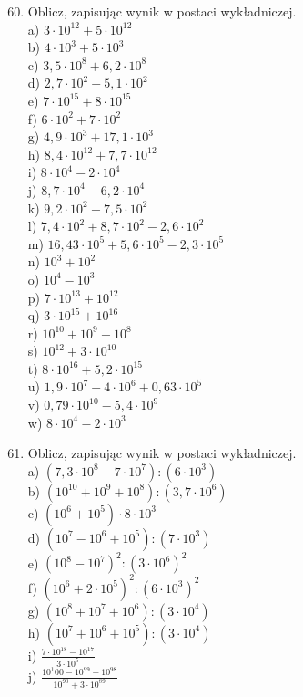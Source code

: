 \documentclass[10pt]{article}
\begin{document}
\begin{enumerate}
  \setcounter{enumi}{59}
  \item Oblicz, zapisując wynik w postaci wykładniczej.\\
a) \(3 \cdot 10^{12}+5 \cdot 10^{12}\)\\
b) \(4 \cdot 10^{3}+5 \cdot 10^{3}\)\\
c) \(3,5 \cdot 10^{8}+6,2 \cdot 10^{8}\)\\
d) \(2,7 \cdot 10^{2}+5,1 \cdot 10^{2}\)\\
e) \(7 \cdot 10^{15}+8 \cdot 10^{15}\)\\
f) \(6 \cdot 10^{2}+7 \cdot 10^{2}\)\\
g) \(4,9 \cdot 10^{3}+17,1 \cdot 10^{3}\)\\
h) \(8,4 \cdot 10^{12}+7,7 \cdot 10^{12}\)\\
i) \(8 \cdot 10^{4}-2 \cdot 10^{4}\)\\
j) \(8,7 \cdot 10^{4}-6,2 \cdot 10^{4}\)\\
k) \(9,2 \cdot 10^{2}-7,5 \cdot 10^{2}\)\\
l) \(7,4 \cdot 10^{2}+8,7 \cdot 10^{2}-2,6 \cdot 10^{2}\)\\
m) \(16,43 \cdot 10^{5}+5,6 \cdot 10^{5}-2,3 \cdot 10^{5}\)\\
n) \(10^{3}+10^{2}\)\\
o) \(10^{4}-10^{3}\)\\
p) \(7 \cdot 10^{13}+10^{12}\)\\
q) \(3 \cdot 10^{15}+10^{16}\)\\
r) \(10^{10}+10^{9}+10^{8}\)\\
s) \(10^{12}+3 \cdot 10^{10}\)\\
t) \(8 \cdot 10^{16}+5,2 \cdot 10^{15}\)\\
u) \(1,9 \cdot 10^{7}+4 \cdot 10^{6}+0,63 \cdot 10^{5}\)\\
v) \(0,79 \cdot 10^{10}-5,4 \cdot 10^{9}\)\\
w) \(8 \cdot 10^{4}-2 \cdot 10^{3}\)
  \item Oblicz, zapisując wynik w postaci wykładniczej.\\
a) \(\left(7,3 \cdot 10^{8}-7 \cdot 10^{7}\right):\left(6 \cdot 10^{3}\right)\)\\
b) \(\left(10^{10}+10^{9}+10^{8}\right):\left(3,7 \cdot 10^{6}\right)\)\\
c) \(\left(10^{6}+10^{5}\right) \cdot 8 \cdot 10^{3}\)\\
d) \(\left(10^{7}-10^{6}+10^{5}\right):\left(7 \cdot 10^{3}\right)\)\\
e) \(\left(10^{8}-10^{7}\right)^{2}:\left(3 \cdot 10^{6}\right)^{2}\)\\
f) \(\left(10^{6}+2 \cdot 10^{5}\right)^{2}:\left(6 \cdot 10^{3}\right)^{2}\)\\
g) \(\left(10^{8}+10^{7}+10^{6}\right):\left(3 \cdot 10^{4}\right)\)\\
h) \(\left(10^{7}+10^{6}+10^{5}\right):\left(3 \cdot 10^{4}\right)\)\\
i) \(\frac{7 \cdot 10^{18}-10^{17}}{3 \cdot 10^{5}}\)\\
j) \(\frac{10^{1} 00-10^{99}+10^{98}}{10^{90}+3 \cdot 10^{89}}\)
\end{enumerate}
\end{document}
